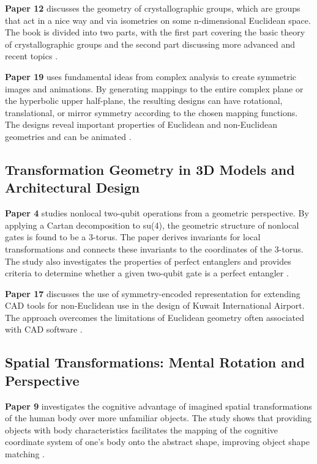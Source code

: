 \documentclass{article}
\begin{document}
\textbf{Paper 12} discusses the geometry of crystallographic groups, which are groups that act in a nice way and via isometries on some n-dimensional Euclidean space. The book is divided into two parts, with the first part covering the basic theory of crystallographic groups and the second part discussing more advanced and recent topics \cite{Szczepaski2012GeometryOC}.

\textbf{Paper 19} uses fundamental ideas from complex analysis to create symmetric images and animations. By generating mappings to the entire complex plane or the hyperbolic upper half-plane, the resulting designs can have rotational, translational, or mirror symmetry according to the chosen mapping functions. The designs reveal important properties of Euclidean and non-Euclidean geometries and can be animated \cite{Gullerud2020SymmetryAA}.

\subsection{Transformation Geometry in 3D Models and Architectural Design}

\textbf{Paper 4} studies nonlocal two-qubit operations from a geometric perspective. By applying a Cartan decomposition to su(4), the geometric structure of nonlocal gates is found to be a 3-torus. The paper derives invariants for local transformations and connects these invariants to the coordinates of the 3-torus. The study also investigates the properties of perfect entanglers and provides criteria to determine whether a given two-qubit gate is a perfect entangler \cite{Zhang2002GeometricTO}.

\textbf{Paper 17} discusses the use of symmetry-encoded representation for extending CAD tools for non-Euclidean use in the design of Kuwait International Airport. The approach overcomes the limitations of Euclidean geometry often associated with CAD software \cite{Josefsson2013SymmetryAG}.

\subsection{Spatial Transformations: Mental Rotation and Perspective}

\textbf{Paper 9} investigates the cognitive advantage of imagined spatial transformations of the human body over more unfamiliar objects. The study shows that providing objects with body characteristics facilitates the mapping of the cognitive coordinate system of one's body onto the abstract shape, improving object shape matching \cite{Amorim2006EmbodiedST}.
\end{document}
